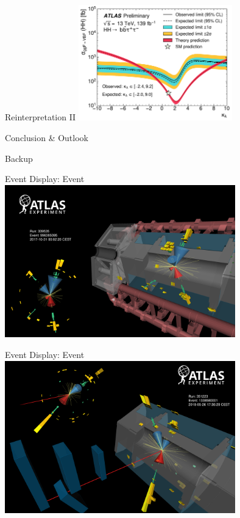 \documentclass[11pt, xcolor={dvipsnames}, aspectratio=169]{beamer}
\begin{document}

\begin{frame}{Reinterpretation II}
  \includegraphics[width=0.5\textwidth]{self_coupling/klam_scan_result}
\end{frame}


\begin{frame}{Conclusion \& Outlook}
\end{frame}


\begin{frame}[standout]
  Backup
\end{frame}


\begin{frame}{Event Display: \hadhad Event}
  \centering
  \includegraphics[width=0.75\textwidth]{event_displays/hadhad}
\end{frame}


\begin{frame}{Event Display: \lephad Event}
  \centering
  \includegraphics[width=0.75\textwidth]{event_displays/lephad}
\end{frame}

\end{document}
